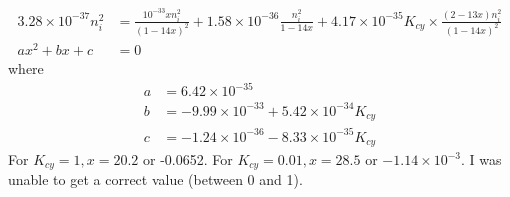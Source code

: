 \documentclass[answers]{exam}
\begin{document}
\begin{questions}
\begin{solution}
\begin{align*}
        3.28 \times 10^{-37}n_i^2 &= \frac{10^{-33}xn_i^2}{(1-14x)^2} + 1.58 \times 10^{-36} \frac{n_i^2}{1-14x} + 4.17 \times 10^{-35} K_{cy} \times \frac{(2-13x)n_i^2}{(1-14x)^2} \\
        ax^2 + bx + c &= 0
    \end{align*}
    where
    \begin{align*}
        a &= 6.42 \times 10^{-35} \\
        b &= -9.99 \times 10^{-33} + 5.42 \times 10^{-34}K_{cy} \\
        c &= -1.24 \times 10^{-36} - 8.33 \times 10^{-35}K_{cy}
    \end{align*}
    For $K_{cy} = 1, x = 20.2$ or -0.0652. For $K_{cy} = 0.01, x = 28.5$ or $-1.14 \times 10^{-3}$. I was unable to get a correct value (between 0 and 1).

\end{solution}

\end{questions}
\end{document}
